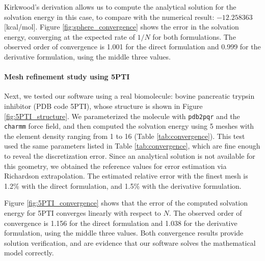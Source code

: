 Kirkwood's derivation \cite{kirkwood1934theory} allows us to compute the analytical solution for the solvation energy in this case, to compare with the numerical result: $-12.258363$ [kcal/mol].
Figure \ref{fig:sphere_convergence} shows the error in the solvation energy, converging at the expected rate of $1/N$ for both formulations.
The observed order of convergence is 1.001 for the direct formulation and 0.999 for the derivative formulation, using the middle three values.

\paragraph{Mesh refinement study using 5PTI} \label{result_convergence_5PTI}

Next, we tested our software using a real biomolecule: bovine pancreatic trypsin inhibitor (PDB code 5PTI), whose structure \cite{wlodawer1984structure} is shown in Figure \ref{fig:5PTI_structure}.
We parameterized the molecule with \texttt{pdb2pqr} and the \texttt{charmm} force field, and then computed the solvation energy using 5 meshes with the element density ranging from 1 to 16 (Table \ref{tab:convergence}).
This test used the same parameters listed in Table \ref{tab:convergence}, which are fine enough to reveal the discretization error.
Since an analytical solution is not available for this geometry, we obtained the reference values for error estimation via Richardson extrapolation.
The estimated relative error with the finest mesh is 1.2\% with the direct formulation, and 1.5\% with the derivative formulation.



Figure \ref{fig:5PTI_convergence} shows that the error of the computed solvation energy for 5PTI converges linearly with respect to $N$.
The observed order of convergence is 1.156 for the direct formulation and 1.038 for the derivative formulation, using the middle three values.
Both convergence results provide solution verification, and are evidence that our software solves the mathematical model correctly.

